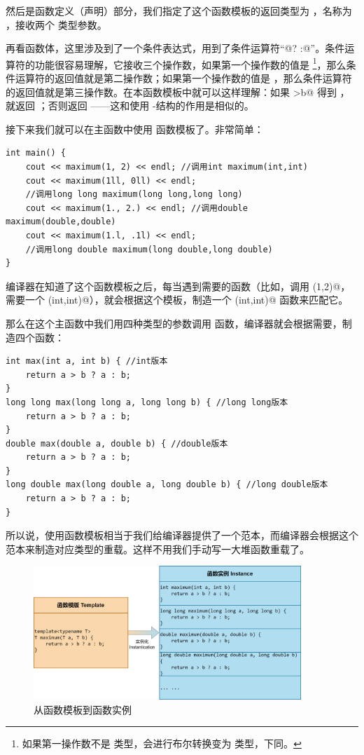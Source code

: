 然后是函数定义（声明）部分，我们指定了这个函数模板的返回类型为 \lstinline@T@，名称为 \lstinline@maximum@，接收两个 \lstinline@T@ 类型参数。\par
再看函数体，这里涉及到了一个条件表达式，用到了条件运算符``@? :@''。条件运算符的功能很容易理解，它接收三个操作数，如果第一个操作数的值是 \lstinline@true@\footnote{如果第一操作数不是 \lstinline@bool@ 类型，会进行布尔转换变为 \lstinline@bool@ 类型，下同。}，那么条件运算符的返回值就是第二操作数；如果第一个操作数的值是 \lstinline@false@，那么条件运算符的返回值就是第三操作数。在本函数模板中就可以这样理解：如果 \lstinline@a>b@ 得到 \lstinline@true@，就返回 \lstinline@a@；否则返回 \lstinline@b@——这和使用 \lstinline@if@-\lstinline@else@ 结构的作用是相似的。\par
接下来我们就可以在主函数中使用 \lstinline@maximum@ 函数模板了。非常简单：
\begin{lstlisting}
int main() {
    cout << maximum(1, 2) << endl; //调用int maximum(int,int)
    cout << maximum(1ll, 0ll) << endl;
    //调用long long maximum(long long,long long)
    cout << maximum(1., 2.) << endl; //调用double maximum(double,double)
    cout << maximum(1.l, .1l) << endl;
    //调用long double maximum(long double,long double)
}
\end{lstlisting}
编译器在知道了这个函数模板之后，每当遇到需要的函数（比如，调用 \lstinline@maximum(1,2)@，需要一个 \lstinline@maximum(int,int)@），就会根据这个模板，制造一个 \lstinline@maximum(int,int)@ 函数来匹配它。\par
那么在这个主函数中我们用四种类型的参数调用 \lstinline@maximum@ 函数，编译器就会根据需要，制造四个函数：
\begin{lstlisting}
int max(int a, int b) { //int版本
    return a > b ? a : b;
}
long long max(long long a, long long b) { //long long版本
    return a > b ? a : b;
}
double max(double a, double b) { //double版本
    return a > b ? a : b;
}
long double max(long double a, long double b) { //long double版本
    return a > b ? a : b;
}
\end{lstlisting}\par
所以说，使用函数模板相当于我们给编译器提供了一个范本，而编译器会根据这个范本来制造对应类型的重载。这样不用我们手动写一大堆函数重载了。\par
\begin{figure}[htbp]
    \centering
    \includegraphics[width=0.9\textwidth]{.//images/generalized_parts/04_function_template_and_instance_300.png}
    \caption{从函数模板到函数实例}
\end{figure}
